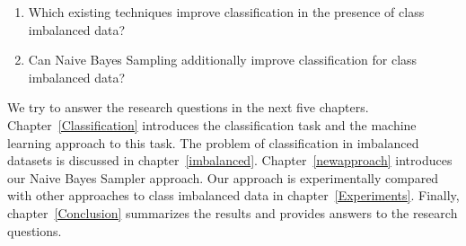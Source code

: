 \begin{enumerate}
\item Which existing techniques improve classification in the presence of class imbalanced data?
\item Can Naive Bayes Sampling additionally improve classification for class imbalanced data?
\end{enumerate}

We try to answer the research questions in the next five chapters. Chapter~\ref{Classification} introduces the classification task and the machine learning approach to this task. The problem of classification in imbalanced datasets is discussed in chapter~\ref{imbalanced}. Chapter~\ref{newapproach} introduces our Naive Bayes Sampler approach. Our approach is experimentally compared with other approaches to class imbalanced data in chapter~\ref{Experiments}. Finally, chapter~\ref{Conclusion} summarizes the results and provides answers to the research questions.
